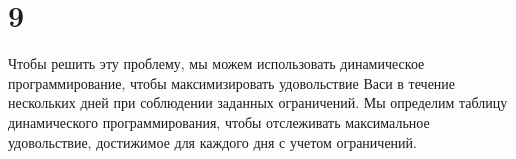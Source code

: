 \documentclass[12pt]{extarticle}
\begin{document}
\section*{9}
Чтобы решить эту проблему, мы можем использовать динамическое программирование, чтобы максимизировать удовольствие Васи в течение нескольких дней при соблюдении заданных ограничений. Мы определим таблицу динамического программирования, чтобы отслеживать максимальное удовольствие, достижимое для каждого дня с учетом ограничений.
\end{document}

